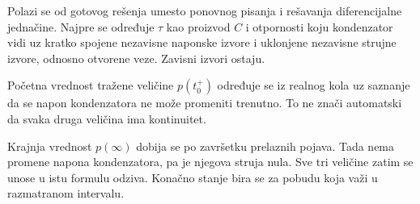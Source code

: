 Polazi se od gotovog rešenja umesto ponovnog pisanja i rešavanja diferencijalne jednačine. Najpre se određuje $\tau$ kao proizvod $C$ i otpornosti koju kondenzator vidi uz kratko spojene nezavisne naponske izvore i uklonjene nezavisne strujne izvore, odnosno otvorene veze. Zavisni izvori ostaju.

Početna vrednost tražene veličine $p(t_0^+)$ određuje se iz realnog kola uz saznanje da se napon kondenzatora ne može promeniti trenutno. To ne znači automatski da svaka druga veličina ima kontinuitet.

Krajnja vrednost $p(\infty)$ dobija se po završetku prelaznih pojava. Tada nema promene napona kondenzatora, pa je njegova struja nula. Sve tri veličine zatim se unose u istu formulu odziva. Konačno stanje bira se za pobudu koja važi u razmatranom intervalu.
